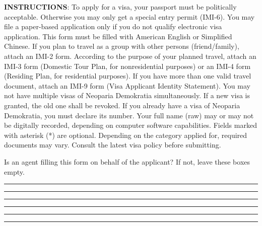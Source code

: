 




\begin{minipage}{\textwidth}
	\small
	\textbf{INSTRUCTIONS}:
	\inlinelistitem To apply for a visa, your passport must be politically acceptable. Otherwise you may only get a special entry permit (IMI-6).
	\inlinelistitem You may file a paper-based application only if you do not qualify electronic visa application.
	\inlinelistitem This form must be filled with American English or Simplified Chinese.
	\inlinelistitem If you plan to travel as a group with other persons (friend/family), attach an IMI-2 form.
	\inlinelistitem According to the purpose of your planned travel, attach an IMI-3 form (Domestic Tour Plan, for nonresidential purposes) or an IMI-4 form (Residing Plan, for residential purposes).
	\inlinelistitem If you have more than one valid travel document, attach an IMI-9 form (Visa Applicant Identity Statement).
	\inlinelistitem You may not have multiple visas of Neoparia Demokratia simultaneously. If a new visa is granted, the old one shall be revoked. If you already have a visa of Neoparia Demokratia, you must declare its number.
	\inlinelistitem Your full name (raw) may or may not be digitally recorded, depending on computer software capabilities.
	\inlinelistitem Fields marked with asterisk (*) are optional.
	\inlinelistitem Depending on the category applied for, required documents may vary. Consult the latest visa policy before submitting.
\end{minipage}
\vskip 20pt




\formbrickcontentheight=27pt

\textsf{\small Is an agent filling this form on behalf of the applicant? If not, leave these boxes empty.}
\par\hrule
\formbrickVlineLeft%
\formbrickVlineMid%
\formbrickVlineRight%
\par\hrule
\vskip 5pt

\formbrickcontentheight=33pt

\par\hrule
\formbrickVlineLeft%
\formbrickVlineRight%
\par\hrule
\formbrickVlineLeft%
\formbrickVlineRight%
\par\hrule
\formbrickVlineLeft%
\formbrickVlineRight%
\par\hrule
\vskip 5pt

